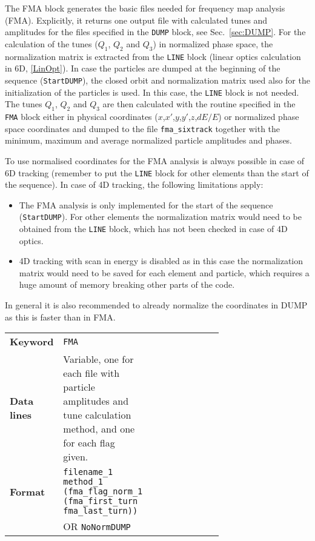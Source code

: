 The FMA block generates the basic files needed for frequency map analysis (FMA).
Explicitly, it returns one output file with calculated tunes and amplitudes for the files specified in the \texttt{DUMP} block, see Sec.~\ref{sec:DUMP}.
For the calculation of the tunes ($Q_1$, $Q_2$ and $Q_3$) in normalized phase space, the normalization matrix is extracted from the \texttt{LINE} block (linear optics calculation in 6D, \ref{LinOpt}).
In case the particles are dumped at the beginning of the sequence (\texttt{StartDUMP}), the closed orbit and normalization matrix used also for the initialization of the particles is used.
In this case, the \texttt{LINE} block is not needed.
The tunes $Q_1$, $Q_2$ and $Q_3$ are then calculated with the routine specified in the \texttt{FMA} block either in physical coordinates ($x$,$x'$,$y$,$y'$,$z$,$dE/E$) or normalized phase space coordinates and dumped to the file \texttt{fma\_sixtrack} together with the minimum, maximum and average normalized particle amplitudes and phases.

To use normalised coordinates for the FMA analysis is always possible in case of 6D tracking (remember to put the \texttt{LINE} block for other elements than the start of the sequence). In case of 4D tracking, the following limitations apply:
\begin{itemize}
    \item The FMA analysis is only implemented for the start of the sequence (\texttt{StartDUMP}). For other elements the normalization matrix would need to be obtained from the \texttt{LINE} block, which has not been checked in case of 4D optics.
    \item 4D tracking with scan in energy is disabled as in this case the normalization matrix would need to be saved for each element and particle, which requires a huge amount of memory breaking other parts of the code.
\end{itemize}
In general it is also recommended to already normalize the coordinates in DUMP as this is faster than in FMA.

\bigskip
\begin{tabular}{@{}llp{0.7\linewidth}}
    \textbf{Keyword}    & \texttt{FMA} \\
    \textbf{Data lines} & Variable, one for each file with particle amplitudes and tune calculation method, and one for each flag given. \\
    \textbf{Format}     & \texttt{filename\_1 method\_1 (fma\_flag\_norm\_1 (fma\_first\_turn fma\_last\_turn))}\\
                        & OR \texttt{NoNormDUMP}\\
\end{tabular}

